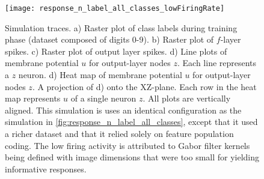 \documentclass{report}
\begin{document}
\begin{figure}[ht]
\centering
\texttt{[image: response\_n\_label\_all\_classes\_lowFiringRate]}
\caption{Simulation traces. a) Raster plot of class labels during training phase (dataset composed of digits 0-9). b) Raster plot of $f$-layer spikes. c) Raster plot of output layer spikes. d) Line plots of membrane potential $u$ for output-layer nodes $z$. Each line represents a $z$ neuron. d) Heat map of membrane potential $u$ for output-layer nodes $z$. A projection of d) onto the XZ-plane. Each row in the heat map represents $u$ of a single neuron $z$. All plots are vertically aligned. This simulation is uses an identical configuration as the simulation in \cref{fig:response_n_label_all_classes}, except that it used a richer dataset and that it relied solely on feature population coding. The low firing activity is attributed to Gabor filter kernels being defined with image dimensions that were too small for yielding informative responses.
\label{fig:response_n_label_all_classes_lowFiringRate}}
\end{figure}
\end{document}
